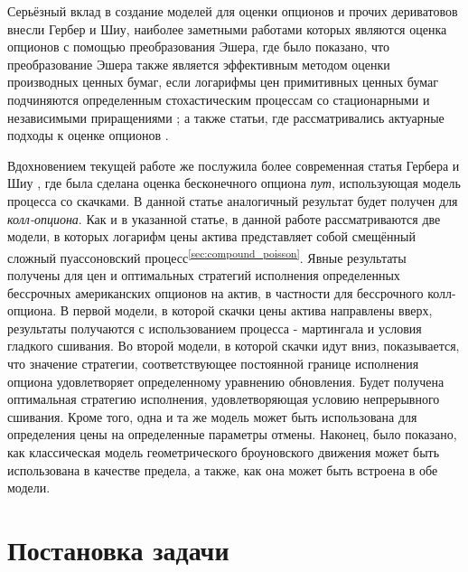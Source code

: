 \documentclass[a4paper,12pt]{article}
\theoremstyle{definition}
\begin{document}
Серьёзный вклад в создание моделей для оценки опционов и прочих дериватовов внесли Гербер и Шиу, наиболее заметными работами которых являются оценка опционов с помощью преобразования Эшера, где было показано, что преобразование Эшера также является эффективным методом оценки производных ценных бумаг, если логарифмы цен примитивных ценных бумаг подчиняются определенным стохастическим процессам со стационарными и независимыми приращениями \cite{bib:GerberShiu_Esscher}; а также статьи, где рассматривались актуарные подходы к оценке опционов \cite{bib:GerberShiu_Actuarial_1, bib:GerberShiu_Actuarial_2, bib:GerberShiu_Actuarial_3}. 

Вдохновением текущей работе же послужила более современная статья Гербера и Шиу \cite{bib:GerberShiu}, где была сделана оценка бесконечного опциона \textit{пут}, использующая модель процесса со скачками. В данной статье аналогичный результат будет получен для \textit{колл-опциона}. Как и в указанной статье, в данной работе рассматриваются две модели, в которых логарифм цены актива представляет собой смещённый сложный пуассоновский процесс\textsuperscript{\ref{sec:compound_poisson}}. Явные результаты получены для цен и оптимальных стратегий исполнения определенных бессрочных американских опционов на актив, в частности для бессрочного колл-опциона. В первой модели, в которой скачки цены актива направлены вверх, результаты получаются с использованием процесса - мартингала и условия гладкого сшивания. Во второй модели, в которой скачки идут вниз, показывается, что значение стратегии, соответствующее постоянной границе исполнения опциона удовлетворяет определенному уравнению обновления. Будет получена оптимальная стратегию исполнения, удовлетворяющая условию непрерывного сшивания. Кроме того, одна и та же модель может быть использована для определения цены на определенные параметры отмены. Наконец, было показано, как классическая модель геометрического броуновского движения может быть использована в качестве предела, а также, как она может быть встроена в обе модели.


\section{Постановка задачи}
\end{document}
